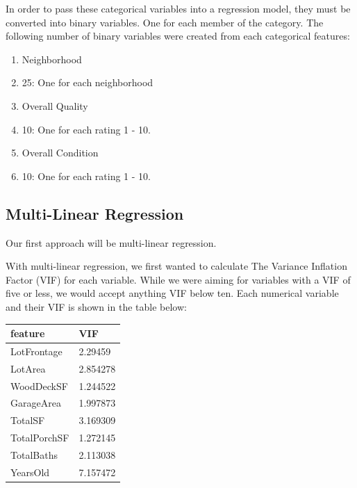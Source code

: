 \documentclass{article}
\begin{document}
	In order to pass these categorical variables into a regression model, they must be converted into binary variables. One for each member of the category. The following number of binary variables were created from each categorical features:

	\begin{enumerate}
		\item Neighborhood
		\item[\textbullet] 25: One for each neighborhood
		\item Overall Quality
		\item[\textbullet] 10: One for each rating 1 - 10.
		\item Overall Condition
		\item[\textbullet] 10: One for each rating 1 - 10.
	\end{enumerate}

	\subsection{Multi-Linear Regression}

	Our first approach will be multi-linear regression.

	With multi-linear regression, we first wanted to calculate The Variance Inflation Factor (VIF) for each variable. While we were aiming for variables with a VIF of five or less, we would accept anything VIF below ten. Each numerical variable and their VIF is shown in the table below:

	\begin{table}[]
		\centering
		\begin{tabular}{ll}
		\hline
		\multicolumn{1}{|l|}{feature} & \multicolumn{1}{l|}{VIF} \\ \hline
		LotFrontage                   & 2.29459                  \\
		LotArea                       & 2.854278                 \\
		WoodDeckSF                    & 1.244522                 \\
		GarageArea                    & 1.997873                 \\
		TotalSF                       & 3.169309                 \\
		TotalPorchSF                  & 1.272145                 \\
		TotalBaths                    & 2.113038                 \\
		YearsOld                      & 7.157472                
		\end{tabular}
		\end{table}
		
\end{document}
